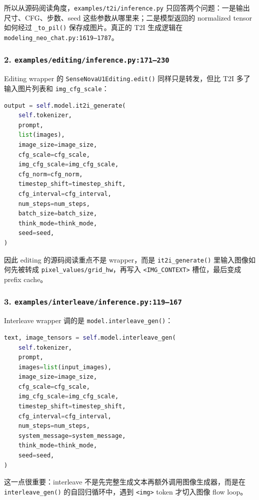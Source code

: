 所以从源码阅读角度，\texttt{examples/t2i/inference.py} 只回答两个问题：一是输出尺寸、CFG、步数、seed 这些参数从哪里来；二是模型返回的 normalized tensor 如何经过 \texttt{\_to\_pil()} 保存成图片。真正的 T2I 生成逻辑在 \texttt{modeling\_neo\_chat.py:1619--1787}。

\subsubsection{2. \texttt{examples/editing/inference.py:171--230}}

Editing wrapper 的 \texttt{SenseNovaU1Editing.edit()} 同样只是转发，但比 T2I 多了输入图片列表和 \texttt{img\_cfg\_scale}：

\begin{lstlisting}[language=Python]
output = self.model.it2i_generate(
    self.tokenizer,
    prompt,
    list(images),
    image_size=image_size,
    cfg_scale=cfg_scale,
    img_cfg_scale=img_cfg_scale,
    cfg_norm=cfg_norm,
    timestep_shift=timestep_shift,
    cfg_interval=cfg_interval,
    num_steps=num_steps,
    batch_size=batch_size,
    think_mode=think_mode,
    seed=seed,
)
\end{lstlisting}

因此 editing 的源码阅读重点不是 wrapper，而是 \texttt{it2i\_generate()} 里输入图像如何先被转成 \texttt{pixel\_values/grid\_hw}，再写入 \texttt{<IMG\_CONTEXT>} 槽位，最后变成 prefix cache。

\subsubsection{3. \texttt{examples/interleave/inference.py:119--167}}

Interleave wrapper 调的是 \texttt{model.interleave\_gen()}：

\begin{lstlisting}[language=Python]
text, image_tensors = self.model.interleave_gen(
    self.tokenizer,
    prompt,
    images=list(input_images),
    image_size=image_size,
    cfg_scale=cfg_scale,
    img_cfg_scale=img_cfg_scale,
    timestep_shift=timestep_shift,
    cfg_interval=cfg_interval,
    num_steps=num_steps,
    system_message=system_message,
    think_mode=think_mode,
    seed=seed,
)
\end{lstlisting}

这一点很重要：interleave 不是先完整生成文本再额外调用图像生成器，而是在 \texttt{interleave\_gen()} 的自回归循环中，遇到 \texttt{<img>} token 才切入图像 flow loop。

